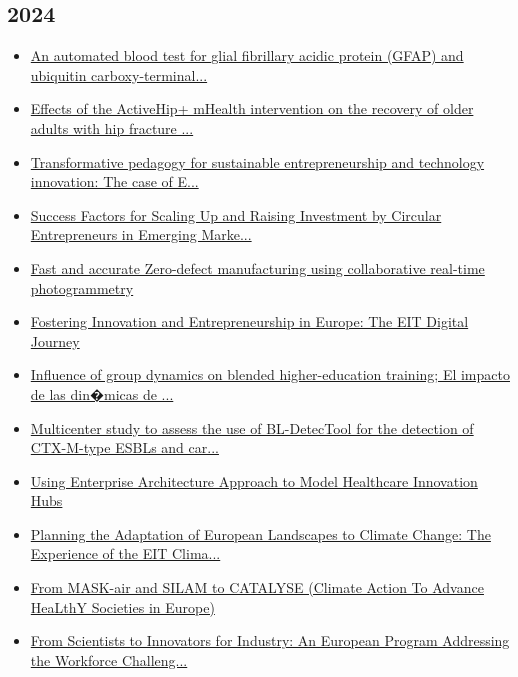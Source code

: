 \subsection*{2024}
\begin{itemize}[leftmargin=*, itemsep=0em, label=\textbullet]
\small
\item \href{https://doi.org/10.1016/j.ebiom.2024.105477}{An automated blood test for glial fibrillary acidic protein (GFAP) and ubiquitin carboxy-terminal...}
\item \href{https://doi.org/10.1016/j.eclinm.2024.102677}{Effects of the ActiveHip+ mHealth intervention on the recovery of older adults with hip fracture ...}
\item \href{https://doi.org/10.1016/j.ijme.2024.100971}{Transformative pedagogy for sustainable entrepreneurship and technology innovation: The case of E...}
\item \href{https://doi.org/10.1007/s43615-023-00319-5}{Success Factors for Scaling Up and Raising Investment by Circular Entrepreneurs in Emerging Marke...}
\item \href{https://doi.org/10.5194/isprs-archives-XLVIII-1-2024-495-2024}{Fast and accurate Zero-defect manufacturing using collaborative real-time photogrammetry}
\item \href{https://doi.org/10.1109/MC.2024.3375623}{Fostering Innovation and Entrepreneurship in Europe: The EIT Digital Journey}
\item \href{https://doi.org/10.4438/1988-592X-RE-2024-403-617}{Influence of group dynamics on blended higher-education training; El impacto de las din�micas de ...}
\item \href{https://doi.org/10.1128/jcm.01136-23}{Multicenter study to assess the use of BL-DetecTool for the detection of CTX-M-type ESBLs and car...}
\item \href{https://doi.org/10.1007/978-3-031-53614-4_7}{Using Enterprise Architecture Approach to Model Healthcare Innovation Hubs}
\item \href{https://doi.org/10.1007/978-3-031-25713-1_19}{Planning the Adaptation of European Landscapes to Climate Change: The Experience of the EIT Clima...}
\item \href{https://doi.org/10.18176/jiaci.0923}{From MASK-air and SILAM to CATALYSE (Climate Action To Advance HeaLthY Societies in Europe)}
\item \href{https://doi.org/10.1007/978-3-031-61992-2_3}{From Scientists to Innovators for Industry: An European Program Addressing the Workforce Challeng...}
\end{itemize}

